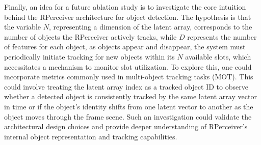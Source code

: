 Finally, an idea for a future ablation study is to investigate the core intuition behind the RPerceiver architecture for object detection. The hypothesis is that the variable $N$, representing a dimension of the latent array, corresponds to the number of objects the RPerceiver actively tracks, while $D$ represents the number of features for each object, as objects appear and disappear, the system must periodically initiate tracking for new objects within its $N$ available slots, which necessitates a mechanism to monitor slot utilization. To explore this, one could incorporate metrics commonly used in multi-object tracking tasks (MOT). This could involve treating the latent array index as a tracked object ID to observe whether a detected object is consistently tracked by the same latent array vector in time or if the object's identity shifts from one latent vector to another as the object moves through the frame scene. Such an investigation could validate the architectural design choices and provide deeper understanding of RPerceiver's internal object representation and tracking capabilities.
